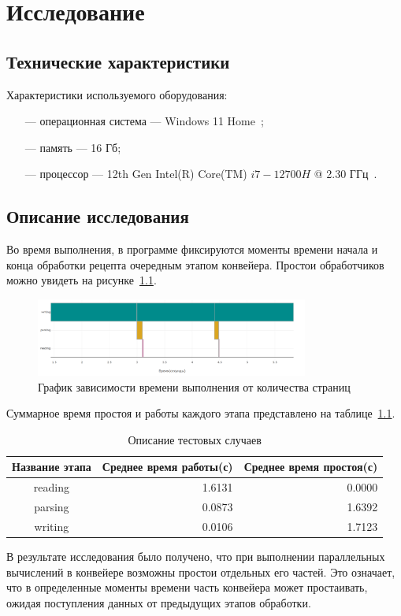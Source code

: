 \chapter{Исследование}

\section{Технические характеристики}
Характеристики используемого оборудования:
\begin{itemize}
    \item[---] операционная система --- Windows 11 Home~\cite{windows};
    \item[---] память --- 16 Гб;
    \item[---] процессор --- 12th Gen Intel(R) Core(TM) $i7-12700H$ @  2.30 ГГц~\cite{intel}.
\end{itemize}

\section{Описание исследования}

Во время выполнения, в программе фиксируются моменты времени начала и конца обработки рецепта очередным этапом конвейера. Простои обработчиков можно увидеть на рисунке~\ref{fig:plot}.

\begin{figure}[h]
	\centering
	\includegraphics[width=0.8\textwidth]{images/plot.png}
	\caption{График зависимости времени выполнения от количества страниц}
	\label{fig:plot}
\end{figure}

\clearpage

Суммарное время простоя и работы каждого этапа представлено на таблице~\ref{tbl:mes}.

\begin{table}[h]
    \begin{center}
        \begin{threeparttable}
    \caption{Описание тестовых случаев}
    \captionsetup{justification=raggedright, singlelinecheck=false}
    \label{tbl:mes}
    \begin{tabular}{|c|r|r|}
        \hline
        \textbf{Название этапа} & \textbf{Среднее время работы(с)} & \textbf{Среднее время простоя(с)} \\
        \hline
        reading & 1.6131 & 0.0000 \\
        \hline
        parsing & 0.0873 & 1.6392 \\
        \hline
        writing & 0.0106 & 1.7123 \\
        \hline
    \end{tabular}
    \end{threeparttable}
    \end{center}
\end{table}

В результате исследования было получено, что при выполнении параллельных вычислений в конвейере возможны простои отдельных его частей. Это означает, что в определенные моменты времени часть конвейера может простаивать, ожидая поступления данных от предыдущих этапов обработки.

\clearpage